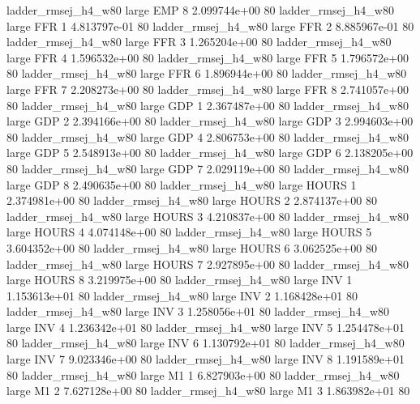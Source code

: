 ladder_rmsej_h4_w80      large      EMP                 8 2.099744e+00 80
ladder_rmsej_h4_w80      large      FFR                 1 4.813797e-01 80
ladder_rmsej_h4_w80      large      FFR                 2 8.885967e-01 80
ladder_rmsej_h4_w80      large      FFR                 3 1.265204e+00 80
ladder_rmsej_h4_w80      large      FFR                 4 1.596532e+00 80
ladder_rmsej_h4_w80      large      FFR                 5 1.796572e+00 80
ladder_rmsej_h4_w80      large      FFR                 6 1.896944e+00 80
ladder_rmsej_h4_w80      large      FFR                 7 2.208273e+00 80
ladder_rmsej_h4_w80      large      FFR                 8 2.741057e+00 80
ladder_rmsej_h4_w80      large      GDP                 1 2.367487e+00 80
ladder_rmsej_h4_w80      large      GDP                 2 2.394166e+00 80
ladder_rmsej_h4_w80      large      GDP                 3 2.994603e+00 80
ladder_rmsej_h4_w80      large      GDP                 4 2.806753e+00 80
ladder_rmsej_h4_w80      large      GDP                 5 2.548913e+00 80
ladder_rmsej_h4_w80      large      GDP                 6 2.138205e+00 80
ladder_rmsej_h4_w80      large      GDP                 7 2.029119e+00 80
ladder_rmsej_h4_w80      large      GDP                 8 2.490635e+00 80
ladder_rmsej_h4_w80      large    HOURS                 1 2.374981e+00 80
ladder_rmsej_h4_w80      large    HOURS                 2 2.874137e+00 80
ladder_rmsej_h4_w80      large    HOURS                 3 4.210837e+00 80
ladder_rmsej_h4_w80      large    HOURS                 4 4.074148e+00 80
ladder_rmsej_h4_w80      large    HOURS                 5 3.604352e+00 80
ladder_rmsej_h4_w80      large    HOURS                 6 3.062525e+00 80
ladder_rmsej_h4_w80      large    HOURS                 7 2.927895e+00 80
ladder_rmsej_h4_w80      large    HOURS                 8 3.219975e+00 80
ladder_rmsej_h4_w80      large      INV                 1 1.153613e+01 80
ladder_rmsej_h4_w80      large      INV                 2 1.168428e+01 80
ladder_rmsej_h4_w80      large      INV                 3 1.258056e+01 80
ladder_rmsej_h4_w80      large      INV                 4 1.236342e+01 80
ladder_rmsej_h4_w80      large      INV                 5 1.254478e+01 80
ladder_rmsej_h4_w80      large      INV                 6 1.130792e+01 80
ladder_rmsej_h4_w80      large      INV                 7 9.023346e+00 80
ladder_rmsej_h4_w80      large      INV                 8 1.191589e+01 80
ladder_rmsej_h4_w80      large       M1                 1 6.827903e+00 80
ladder_rmsej_h4_w80      large       M1                 2 7.627128e+00 80
ladder_rmsej_h4_w80      large       M1                 3 1.863982e+01 80
